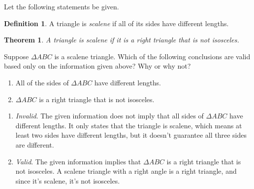 \documentclass{article}
\newtheorem*{theorem}{Theorem}
\theoremstyle{definition}
\newtheorem*{definition}{Definition}
\begin{document}
\begin{question}
    Let the following statements be given. 
       \begin{definition}
          A triangle is \emph{scalene} if all of its sides have different lengths.
       \end{definition}
       \begin{theorem}
          A triangle is scalene if it is a right triangle that is not isosceles.
       \end{theorem}
    Suppose $\Delta ABC$ is a scalene triangle. 
    Which of the following conclusions are valid based only on the information given above? 
    Why or why not?
    \begin{enumerate}
        \item All of the sides of $\Delta ABC$ have different lengths.
        \item $\Delta ABC$ is a right triangle that is not isosceles.
    \end{enumerate}
\end{question}
\begin{solution}
    \begin{enumerate}
        \item \emph{Invalid}. The given information does not imply that all sides of $\Delta ABC$ have different lengths. It only states that the triangle is scalene, which means at least two sides have different lengths, but it doesn't guarantee all three sides are different.
        \item \emph{Valid}. The given information implies that $\Delta ABC$ is a right triangle that is not isosceles. A scalene triangle with a right angle is a right triangle, and since it's scalene, it's not isosceles.
    \end{enumerate}
\end{solution}
\end{document}
